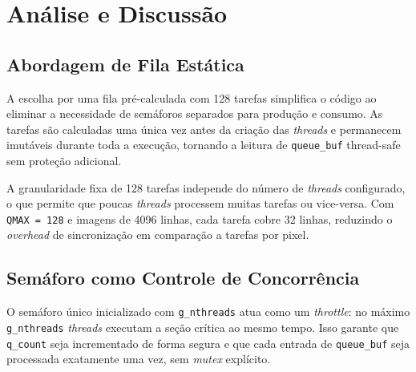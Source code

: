 \documentclass[12 pt]{abntex2}
\begin{document}
\section{Análise e Discussão}
 
\subsection{Abordagem de Fila Estática}
 
A escolha por uma fila pré-calculada com 128 tarefas simplifica o código ao
eliminar a necessidade de semáforos separados para produção e consumo. As
tarefas são calculadas uma única vez antes da criação das \textit{threads} e
permanecem imutáveis durante toda a execução, tornando a leitura de
\texttt{queue\_buf} thread-safe sem proteção adicional.
 
A granularidade fixa de 128 tarefas independe do número de \textit{threads}
configurado, o que permite que poucas \textit{threads} processem muitas
tarefas ou vice-versa. Com \texttt{QMAX = 128} e imagens de 4096 linhas, cada
tarefa cobre 32 linhas, reduzindo o \textit{overhead} de sincronização em
comparação a tarefas por pixel.
 
\subsection{Semáforo como Controle de Concorrência}
 
O semáforo único inicializado com \texttt{g\_nthreads} atua como um
\textit{throttle}: no máximo \texttt{g\_nthreads} \textit{threads} executam
a seção crítica ao mesmo tempo. Isso garante que \texttt{q\_count} seja
incrementado de forma segura e que cada entrada de \texttt{queue\_buf} seja
processada exatamente uma vez, sem \textit{mutex} explícito.
 
 
 
\end{document}

